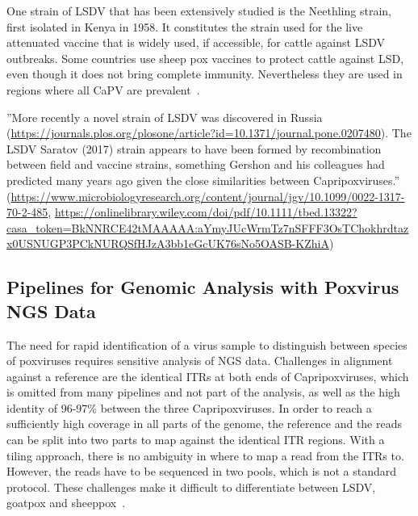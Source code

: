 One strain of \ac{LSDV} that has been extensively studied is the Neethling strain, first isolated in Kenya in 1958. It constitutes the strain used for the live attenuated vaccine that is widely used, if accessible, for cattle against \ac{LSDV} outbreaks. Some countries use sheep pox vaccines to protect cattle against \ac{LSD}, even though it does not bring complete immunity. Nevertheless they are used in regions where all \acs{CaPV} are prevalent~\cite{brenner2009appearance}.

''More recently a novel strain of \ac{LSDV} was discovered in Russia (\url{https://journals.plos.org/plosone/article?id=10.1371/journal.pone.0207480}). The \ac{LSDV} Saratov (2017) strain appears to have been formed by recombination between field and vaccine strains, something Gershon and his colleagues had predicted many years ago given the close similarities between Capripoxviruses.'' (\url{https://www.microbiologyresearch.org/content/journal/jgv/10.1099/0022-1317-70-2-485}, \url{https://onlinelibrary.wiley.com/doi/pdf/10.1111/tbed.13322?casa_token=BkNNRCE42tMAAAAA:aYmyJUcWrmTz7nSFFF3OsTChokhrdtazx0USNUGP3PCkNURQSfHJzA3bb1eGcUK76sNo5OASB-KZhiA}) 

\subsection{Pipelines for Genomic Analysis with Poxvirus NGS Data}\label{sec:2-pox-pipelines}
The need for rapid identification of a virus sample to distinguish between species of poxviruses requires sensitive analysis of \ac{NGS} data. Challenges in alignment against a reference are the identical \acp{ITR} at both ends of Capripoxviruses, which is omitted from many pipelines and not part of the analysis, as well as the high identity of 96-97\% between the three Capripoxviruses. In order to reach a sufficiently high coverage in all parts of the genome, the reference and the reads can be split into two parts to map against the identical \ac{ITR} regions. With a tiling approach, there is no ambiguity in where to map a read from the \acp{ITR} to. However, the reads have to be sequenced in two pools, which is not a standard protocol. These challenges make it difficult to differentiate between \ac{LSDV}, goatpox and sheeppox~\cite{tulman2001genome}.

